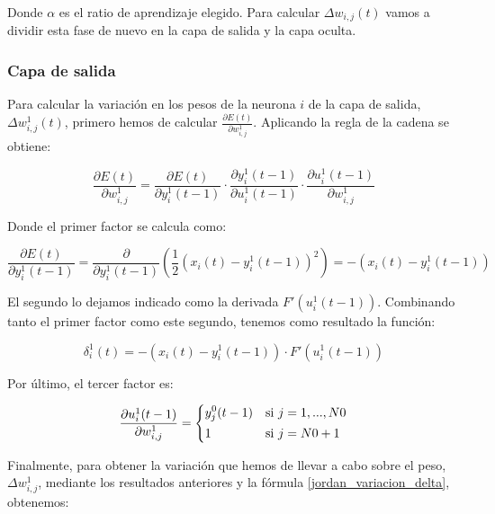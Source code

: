 \documentclass[a4paper,11pt]{article}
\begin{document}
Donde ${\alpha}$ es el ratio de aprendizaje elegido. Para calcular ${\Delta w_{i,j}(t)}$ vamos a dividir esta fase de nuevo en la capa de salida y la capa oculta.

\subsubsection{Capa de salida}
Para calcular la variación en los pesos de la neurona ${i}$ de la capa de salida, ${\Delta w_{i,j}^{1}(t)}$, primero hemos de calcular ${\frac{\partial E(t)}{\partial w_{i,j}^{1}}}$. Aplicando la regla de la cadena se obtiene:

\begin{equation}
	\frac{\partial E(t)}{\partial w_{i,j}^{1}} = \frac{\partial E(t)}{\partial y_{i}^{1}(t-1)} \cdot \frac{\partial y_{i}^{1}(t-1)}{\partial u_{i}^{1}(t-1)} \cdot \frac{\partial u_{i}^{1}(t-1)}{\partial w_{i,j}^{1}}
\end{equation}

Donde el primer factor se calcula como:

\begin{equation}
	\label{jordan_derivada_E}
	\frac{\partial E(t)}{\partial y_{i}^{1}(t-1)} = \frac{\partial}{\partial y_{i}^{1}(t-1)}\left(\frac{1}{2}\left(x_{i}(t)-y_{i}^{1}(t-1)\right)^{2}\right) = -\left(x_{i}(t) - y_{i}^{1}(t-1)\right)
\end{equation}

El segundo lo dejamos indicado como la derivada ${F'\left(u_{i}^{1}(t-1)\right)}$. Combinando tanto el primer factor como este segundo, tenemos como resultado la función:

\begin{equation}
	\delta_{i}^{1}(t) = -\left(x_{i}(t) - y_{i}^{1}(t-1)\right) \cdot F'\left(u_{i}^{1}(t-1)\right)
\end{equation}

Por último, el tercer factor es:

\textbf{\begin{equation}
	\frac{\partial u_{i}^{1}(t-1)}{\partial w_{i,j}^{1}} =
    \begin{dcases}
    	y_{j}^{0}(t-1)	& \textrm{si } j=1,...,N0\\
		1				& \textrm{si } j=N0+1\\
	\end{dcases}
\end{equation}}

Finalmente, para obtener la variación que hemos de llevar a cabo sobre el peso, ${\Delta w_{i,j}^{1}}$, mediante los resultados anteriores y la fórmula \ref{jordan_variacion_delta}, obtenemos:
\end{document}
